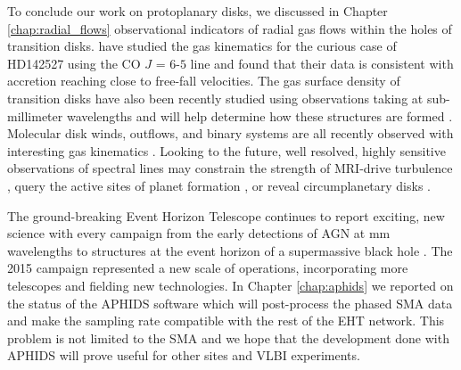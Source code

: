 To conclude our work on protoplanary disks, we discussed in Chapter \ref{chap:radial_flows} observational 
indicators of 
radial gas flows within the holes of transition disks.  \citet{casassus15} have studied the gas kinematics for
the curious case of HD142527 using the CO $J$ = $6$-$5$ line and found that their data is consistent with
accretion reaching close to free-fall velocities.  The gas surface density of transition disks have also 
been recently studied using observations taking at sub-millimeter wavelengths 
\citep{bruderer14,zhang14,canovas15,perez15,vandermarel15} and will help determine how these structures are formed
\citep{bruderer13}.  Molecular disk winds, outflows, and binary systems are all recently observed 
with interesting gas kinematics \citep{klaassen13,dutrey14,williams14,salyk14,czekala15}.  Looking to the 
future, well resolved, highly sensitive observations of spectral lines may constrain the strength of MRI-drive
turbulence \citep{simon15}, query the active sites of planet formation \citep{cleeves15,ober15}, or reveal
circumplanetary disks \citep{perez15}.

The ground-breaking Event Horizon Telescope continues to report exciting, new science with every
campaign from the early detections of AGN at mm wavelengths \citep{doeleman05} to structures
at the event horizon of a supermassive black hole \citep{doeleman08,doeleman12}.
The 2015 campaign represented a new scale of operations, incorporating more telescopes and
fielding new technologies.  In Chapter \ref{chap:aphids} we reported on the status of the APHIDS software which
will post-process the phased SMA data and make the sampling rate compatible with the rest of the EHT
network.  This problem is not limited to the SMA and we hope that the development done with APHIDS will
prove useful for other sites and VLBI experiments. 
